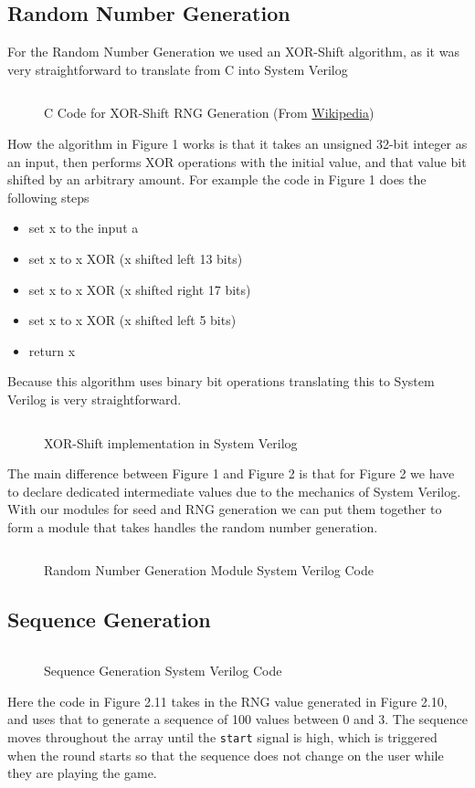 \documentclass{report}
\begin{document}
\subsection{Random Number Generation}
For the Random Number Generation we used an XOR-Shift algorithm, as it was very straightforward to translate from C into System Verilog
\begin{figure}[H]
    \inputminted{C}{../xorshift.c}
    \caption{C Code for XOR-Shift RNG Generation (From \href{https://en.wikipedia.org/wiki/Xorshift}{Wikipedia})}
\end{figure} 
How the algorithm in Figure 1 works is that it takes an unsigned 32-bit integer as an input, then performs XOR operations with the initial value, and that value bit shifted by an arbitrary amount. For example the code in Figure 1 does the following steps
\begin{itemize}
    \item set x to the input a
    \item set x to x XOR (x shifted left 13 bits)
    \item set x  to x XOR (x shifted right 17 bits)
    \item set x to x XOR (x shifted left 5 bits)
    \item return x
\end{itemize}
Because this algorithm uses binary bit operations translating this to System Verilog is very straightforward.
\begin{figure}[H]
    \inputminted{sv}{../xorshift.sv}
    \caption{XOR-Shift implementation in System Verilog}
\end{figure}
The main difference between Figure 1 and Figure 2 is that for Figure 2 we have to declare dedicated intermediate values due to the mechanics of System Verilog. With our modules for seed and RNG generation we can put them together to form a module that takes handles the random number generation.
\begin{figure}[H]
    \inputminted{sv}{../rng_generation.sv}
    \caption{Random Number Generation Module System Verilog Code}
\end{figure}
\subsection{Sequence Generation}
\begin{figure}[H]
    \inputminted{sv}{../sequence_generation.sv}
    \caption{Sequence Generation System Verilog Code}
\end{figure}
Here the code in Figure 2.11 takes in the RNG value generated in Figure 2.10, and uses that to generate a sequence of 100 values between 0 and 3. The sequence moves throughout the array until the \verb|start| signal is high, which is triggered when the round starts so that the sequence does not change on the user while they are playing the game.
\end{document}

